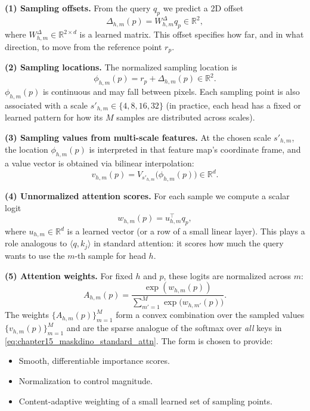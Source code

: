 \begin{enrichment}
\begin{enrichment}
		\textbf{(1) Sampling offsets.}  
		From the query $q_p$ we predict a 2D offset
		\[
		\Delta_{h,m}(p) = W^{\Delta}_{h,m} q_p \in \mathbb{R}^2,
		\]
		where $W^{\Delta}_{h,m} \in \mathbb{R}^{2 \times d}$ is a learned matrix. This offset specifies how far, and in what direction, to move from the reference point $r_p$.
		
		\textbf{(2) Sampling locations.}  
		The normalized sampling location is
		\begin{equation}
			\phi_{h,m}(p) = r_p + \Delta_{h,m}(p) \in \mathbb{R}^2.
			\label{eq:chapter15_maskdino_sampling}
		\end{equation}
		$\phi_{h,m}(p)$ is continuous and may fall between pixels. Each sampling point is also associated with a scale $s'_{h,m} \in \{4,8,16,32\}$ (in practice, each head has a fixed or learned pattern for how its $M$ samples are distributed across scales).
		
		\textbf{(3) Sampling values from multi-scale features.}  
		At the chosen scale $s'_{h,m}$, the location $\phi_{h,m}(p)$ is interpreted in that feature map's coordinate frame, and a value vector is obtained via bilinear interpolation:
		\[
		v_{h,m}(p) = V_{s'_{h,m}}\bigl(\phi_{h,m}(p)\bigr) \in \mathbb{R}^d.
		\]
		
		\textbf{(4) Unnormalized attention scores.}  
		For each sample we compute a scalar logit
		\[
		w_{h,m}(p) = u_{h,m}^\top q_p,
		\]
		where $u_{h,m} \in \mathbb{R}^d$ is a learned vector (or a row of a small linear layer). This plays a role analogous to $\langle q,k_j\rangle$ in standard attention: it scores how much the query wants to use the $m$-th sample for head $h$.
		
		\textbf{(5) Attention weights.}  
		For fixed $h$ and $p$, these logits are normalized across $m$:
		\[
		A_{h,m}(p)
		= \frac{\exp(w_{h,m}(p))}{\sum_{m'=1}^M \exp\bigl(w_{h,m'}(p)\bigr)}.
		\]
		The weights $\{A_{h,m}(p)\}_{m=1}^M$ form a convex combination over the sampled values $\{v_{h,m}(p)\}_{m=1}^M$ and are the sparse analogue of the softmax over \emph{all} keys in \eqref{eq:chapter15_maskdino_standard_attn}. The form is chosen to provide:
		\begin{itemize}
			\item Smooth, differentiable importance scores.
			\item Normalization to control magnitude.
			\item Content-adaptive weighting of a small learned set of sampling points.
		\end{itemize}
		

\end{enrichment}
\end{enrichment}
